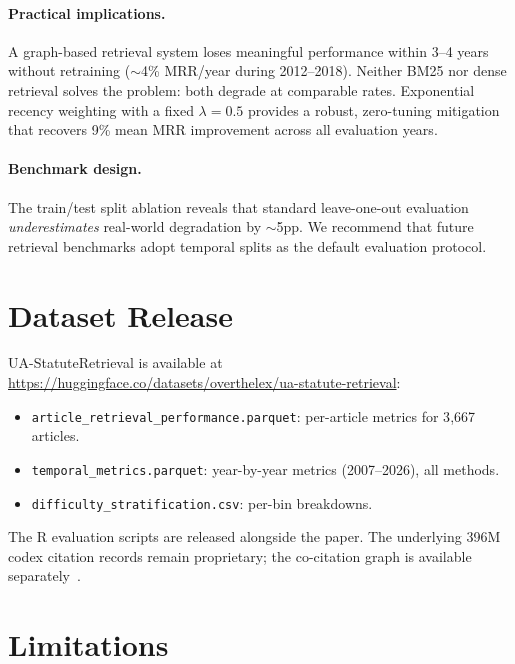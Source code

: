 \documentclass[11pt]{article}
\begin{document}
\paragraph{Practical implications.}
A graph-based retrieval system loses meaningful performance within 3--4 years without retraining ($\sim$4\% MRR/year during 2012--2018).
Neither BM25 nor dense retrieval solves the problem: both degrade at comparable rates.
Exponential recency weighting with a fixed $\lambda = 0.5$ provides a robust, zero-tuning mitigation that recovers 9\% mean MRR improvement across all evaluation years.

\paragraph{Benchmark design.}
The train/test split ablation reveals that standard leave-one-out evaluation \emph{underestimates} real-world degradation by $\sim$5pp.
We recommend that future retrieval benchmarks adopt temporal splits as the default evaluation protocol.

\section{Dataset Release}
\label{sec:release}

UA-StatuteRetrieval is available at \url{https://huggingface.co/datasets/overthelex/ua-statute-retrieval}:

\begin{itemize}[nosep,leftmargin=*]
  \item \texttt{article\_retrieval\_performance.parquet}: per-article metrics for 3{,}667 articles.
  \item \texttt{temporal\_metrics.parquet}: year-by-year metrics (2007--2026), all methods.
  \item \texttt{difficulty\_stratification.csv}: per-bin breakdowns.
\end{itemize}

The R evaluation scripts are released alongside the paper.
The underlying 396M codex citation records remain proprietary; the co-citation graph is available separately~\citep{ovcharov2025citation}.

\section{Limitations}
\label{sec:limitations}
\end{document}
